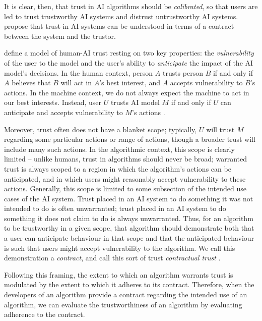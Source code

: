 It is clear, then, that trust in AI algorithms should be \textit{calibrated}, so that users are led to trust trustworthy AI systems and distrust untrustworthy AI systems. \textcite{jacovi_formalizing_2021} propose that trust in AI systems can be understood in terms of a contract between the system and the trustor. 

\textcite{jacovi_formalizing_2021} define a model of human-AI trust resting on two key properties: the \textit{vulnerability} of the user to the model and the user's ability to \textit{anticipate} the impact of the AI model’s decisions. In the human context, person $A$ trusts person $B$ if and only if $A$ believes that $B$ will act in $A$'s best interest, and $A$ accepts vulnerability to $B$'s actions. In the machine context, we do not always expect the machine to act in our best interests. Instead, user $U$ trusts AI model $M$ if and only if $U$ can anticipate and accepts vulnerability to $M$'s actions \cite{jacovi_formalizing_2021}.

Moreover, trust often does not have a blanket scope; typically, $U$ will trust $M$ regarding some particular actions or range of actions, though a broader trust will include many such actions. In the algorithmic context, this scope is clearly limited – unlike humans, trust in algorithms should never be broad; warranted trust is always scoped to a region in which the algorithm's actions can be anticipated, and in which users might reasonably accept vulnerability to these actions. Generally, this scope is limited to some subsection of the intended use cases of the AI system. Trust placed in an AI system to do something it was not intended to do is often unwarranted; trust placed in an AI system to do something it does not claim to do is always unwarranted. Thus, for an algorithm to be trustworthy in a given scope, that algorithm should demonstrate both that a user can anticipate behaviour in that scope and that the anticipated behaviour is such that users might accept vulnerability to the algorithm. We call this demonstration a \emph{contract}, and call this sort of trust \emph{contractual trust} \cite{jacovi_formalizing_2021}.

Following this framing, the extent to which an algorithm warrants trust is modulated by the extent to which it adheres to its contract. Therefore, when the developers of an algorithm provide a contract regarding the intended use of an algorithm, we can evaluate the trustworthiness of an algorithm by evaluating adherence to the contract.

